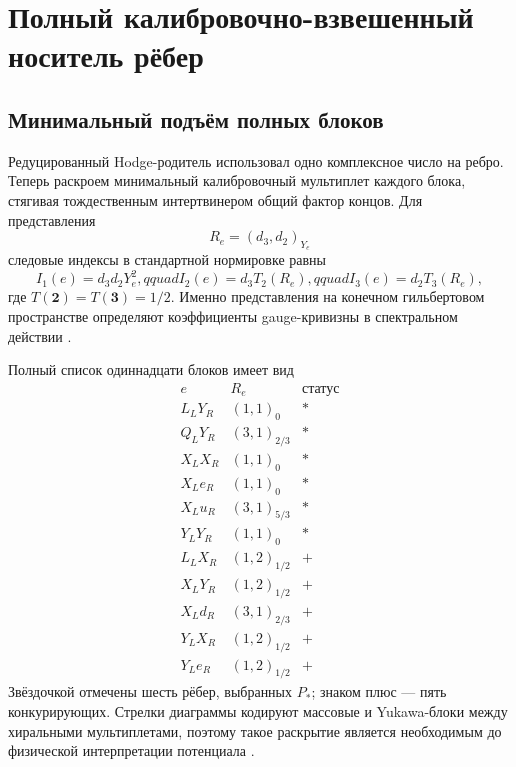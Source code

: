 \chapter{Полный калибровочно-взвешенный носитель рёбер}
\label{ch:v7-full-gauge-weighted-edge-carrier-gate}

\section{Минимальный подъём полных блоков}

Редуцированный Hodge-родитель использовал одно комплексное число на ребро.
Теперь раскроем минимальный калибровочный мультиплет каждого блока, стягивая
тождественным интертвинером общий фактор концов. Для представления
\begin{equation}
 R_e=(d_3,d_2)_{Y_e}
 \label{eq:v7-full-edge-representation}
\end{equation}
следовые индексы в стандартной нормировке равны
\begin{equation}
 I_1(e)=d_3d_2Y_e^2,qquad
 I_2(e)=d_3T_2(R_e),qquad
 I_3(e)=d_2T_3(R_e),
 \label{eq:v7-full-edge-indices}
\end{equation}
где $T(\mathbf2)=T(\mathbf3)=1/2$. Именно представления на конечном
гильбертовом пространстве определяют коэффициенты gauge-кривизны в
спектральном действии \cite{v7-full-edge-spectral-action}.

Полный список одиннадцати блоков имеет вид
\begin{equation}
\begin{array}{c|c|c}
e&R_e&\text{статус}\\ \hline
L_LY_R&(1,1)_0&*\\
Q_LY_R&(3,1)_{2/3}&*\\
X_LX_R&(1,1)_0&*\\
X_Le_R&(1,1)_0&*\\
X_Lu_R&(3,1)_{5/3}&*\\
Y_LY_R&(1,1)_0&*\\ \hline
L_LX_R&(1,2)_{1/2}&+\\
X_LY_R&(1,2)_{1/2}&+\\
X_Ld_R&(3,1)_{2/3}&+\\
Y_LX_R&(1,2)_{1/2}&+\\
Y_Le_R&(1,2)_{1/2}&+
\end{array}
 \label{eq:v7-full-edge-multiplet-table}
\end{equation}
Звёздочкой отмечены шесть рёбер, выбранных $P_*$; знаком плюс --- пять
конкурирующих. Стрелки диаграммы кодируют массовые и Yukawa-блоки между
хиральными мультиплетами, поэтому такое раскрытие является необходимым до
физической интерпретации потенциала \cite{v7-full-edge-krajewski}.

